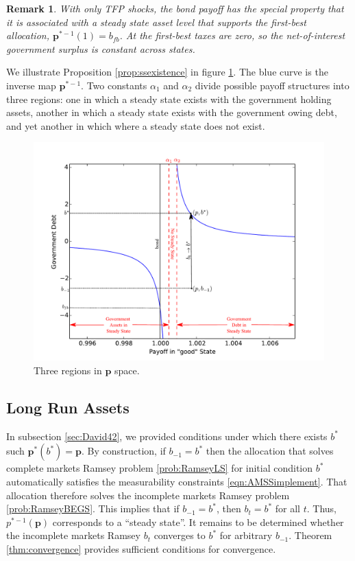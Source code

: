 \documentclass[12pt]{article}
\newtheorem{remark}[theorem]{Remark}
\begin{document}
\begin{remark}
		With only TFP shocks, the bond payoff has the special property that it is associated with a steady state asset level that supports the first-best allocation, $\bm p^{* -1}(1) = b_{fb}$.  At the first-best taxes are zero, so the net-of-interest government surplus is constant across states.
		\end{remark}
		We illustrate Proposition \ref{prop:ssexistence} in figure \ref{fig:noStable}.  The  blue curve is the inverse map $\bm p^{*-1}$.  Two constants $\alpha_1$ and $\alpha_2$ divide  possible payoff structures into three regions: one in which a steady state exists with the government holding assets,
another in which  a steady state exists with the government owing debt, and yet another in which  where a steady state does not exist.
		\begin{figure}[ht]
		\begin{center}
		\includegraphics[width=5.5in]{Images/graph_nostable.pdf}
\caption{Three regions in $\bm{p}$ space.\label{fig:noStable}}
	\end{center}	
	\end{figure}
\subsection{Long Run Assets} \label{sec:David43}
In subsection \ref{sec:David42},  we provided conditions under which there exists $b^*$ such $\bm p^*(b^*) = \bm p$.  By construction, if $b_{-1} = b^*$ then the allocation that solves complete markets Ramsey problem \ref{prob:RamseyLS} for initial condition $b^*$  automatically satisfies the measurability constraints \eqref{eqn:AMSSimplement}.  That allocation therefore solves the incomplete markets Ramsey problem \ref{prob:RamseyBEGS}.  This implies that if $b_{-1} = b^*$, then $b_t = b^*$ for all $t$.  Thus, $p^{*-1}(\bm p)$ corresponds to a ``steady state''.  It remains to be determined whether  the incomplete markets Ramsey $b_t$  converges to  $b^*$  for arbitrary $b_{-1}$.  Theorem \ref{thm:convergence} provides sufficient conditions for  convergence.
\end{document}
